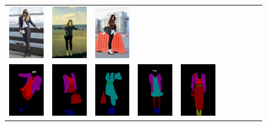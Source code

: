 \begin{figure}[H]
\begin{tabular}{cccccccccc}
		\includegraphics[width=.1\textwidth]{./figures/dataset/0020910_b.jpg} &
		\includegraphics[width=.1\textwidth]{./figures/dataset/0021450_b.jpg} &
		\includegraphics[width=.1\textwidth]{./figures/dataset/0022212_b.jpg}\\
		\includegraphics[width=.1\textwidth]{./figures/dataset/0023328.png} & 
		\includegraphics[width=.1\textwidth]{./figures/dataset/0019351.png} &
		\includegraphics[width=.1\textwidth]{./figures/dataset/0019891.png} &
		\includegraphics[width=.1\textwidth]{./figures/dataset/0020171.png} &
		\includegraphics[width=.1\textwidth]{./figures/dataset/0020348.png} & 

\end{tabular}
\end{figure}
